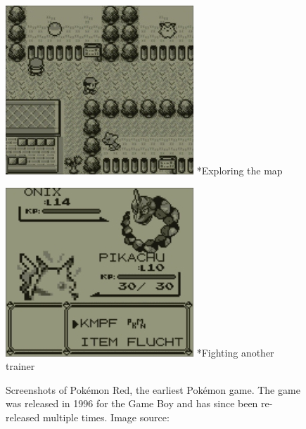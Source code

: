 \begin{figure}[ht]
  \centering
  \begin{minipage}{.5\textwidth}
    \centering
    \includegraphics[width=.95\linewidth]{images/Red-0.jpg}
    \captionsetup{margin=0.5cm}
    *{Exploring the map}
  \end{minipage}%
  \begin{minipage}{.5\textwidth}
    \centering
    \includegraphics[width=.95\linewidth]{images/Red-1.jpg}
    \captionsetup{margin=0.5cm}
    *{Fighting another trainer}
  \end{minipage}
  \captionsetup{justification=centering,margin=1cm}
  \caption{Screenshots of Pokémon Red, the earliest Pokémon game. The game was released in 1996 for the Game Boy and has since been re-released multiple times. 
  Image source:~\autocite{Nintendo:PokemonRed}}
  \label{fig:screenshot-red}
\end{figure}
